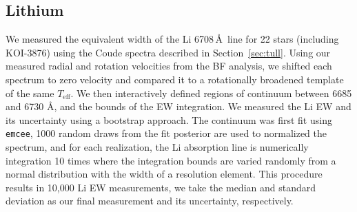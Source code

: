 \documentclass[twocolumn]{aastex631}
\newcommand{\name}{KOI-3876}
\newcommand{\vsini}{$v\sin{i_*}$}
\newcommand{\teff}{\ensuremath{T_{\text{eff}}}}
\begin{document}
\subsection{Lithium}



We measured the equivalent width of the Li 6708\,\AA\ line for 22 stars (including \name) using the Coude spectra described in Section~\ref{sec:tull}. Using our measured radial and rotation velocities from the BF analysis, we shifted each spectrum to zero velocity and compared it to a rotationally broadened template of the same \teff. We then interactively defined regions of continuum between 6685 and 6730 \AA, and the bounds of the EW integration. We measured the Li EW and its uncertainty using a bootstrap approach. The continuum was first fit using {\tt emcee}, 1000 random draws from the fit posterior are used to normalized the spectrum, and for each realization, the Li absorption line is numerically integration 10 times where the integration bounds are varied randomly from a normal distribution with the width of a resolution element. This procedure results in 10,000 Li EW measurements, we take the median and standard deviation as our final measurement and its uncertainty, respectively.  
\end{document}
